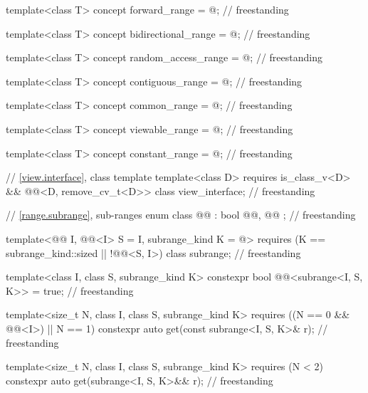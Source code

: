 \begin{codeblock}
{  template<class T>
    concept forward_range = @\seebelow@;                                              // freestanding

  template<class T>
    concept bidirectional_range = @\seebelow@;                                        // freestanding

  template<class T>
    concept random_access_range = @\seebelow@;                                        // freestanding

  template<class T>
    concept contiguous_range = @\seebelow@;                                           // freestanding

  template<class T>
    concept common_range = @\seebelow@;                                               // freestanding

  template<class T>
    concept viewable_range = @\seebelow@;                                             // freestanding

  template<class T>
    concept constant_range = @\seebelow@;                                             // freestanding

  // \ref{view.interface}, class template 
  template<class D>
    requires is_class_v<D> && @@<D, remove_cv_t<D>>
  class view_interface;                                                             // freestanding

  // \ref{range.subrange}, sub-ranges
  enum class @@ : bool { @@, @@ };                               // freestanding

  template<@@ I, @@<I> S = I, subrange_kind K = @\seebelow@>
    requires (K == subrange_kind::sized || !@@<S, I>)
  class subrange;                                                                   // freestanding

  template<class I, class S, subrange_kind K>
    constexpr bool @@<subrange<I, S, K>> = true;                 // freestanding

  template<size_t N, class I, class S, subrange_kind K>
    requires ((N == 0 && @@<I>) || N == 1)
    constexpr auto get(const subrange<I, S, K>& r);                                 // freestanding

  template<size_t N, class I, class S, subrange_kind K>
    requires (N < 2)
    constexpr auto get(subrange<I, S, K>&& r);                                      // freestanding
}


\end{codeblock}
